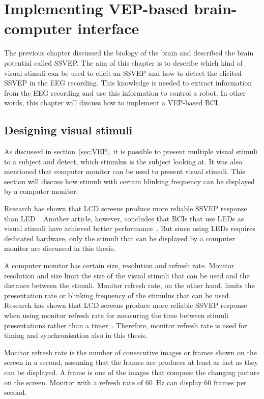 
\chapter{Implementing VEP-based brain-computer interface}

The previous chapter discussed the biology of the brain and described the brain potential called \gls{SSVEP}. The aim of this chapter is to describe which kind of visual stimuli can be used to elicit an \gls{SSVEP} and how to detect the elicited \gls{SSVEP} in the \gls{EEG} recording. This knowledge is needed to extract information from the \gls{EEG} recording and use this information to control a robot. In other words, this chapter will discuss how to implement a \gls{VEP}-based \gls{BCI}.

\section{Designing visual stimuli}
\label{sec:stimuli}

As discussed in section~\ref{sec:VEP}, it is possible to present multiple visual stimuli to a subject and detect, which stimulus is the subject looking at. It was also mentioned that computer monitor can be used to present visual stimuli. This section will discuss how stimuli with certain blinking frequency can be displayed by a computer monitor.

Research has shown that LCD screens produce more reliable \gls{SSVEP} response than \gls{LED}~\cite{lcd_lcd_led}. Another article, however, concludes that \glspl{BCI} that use \glspl{LED} as visual stimuli have achieved better performance~\cite{ssvep_stim}. But since using \glspl{LED} requires dedicated hardware, only the stimuli that can be displayed by a computer monitor are discussed in this thesis.

A computer monitor has certain size, resolution and \gls{refresh rate}. Monitor resolution and size limit the size of the visual stimuli that can be used and the distance between the stimuli. Monitor \gls{refresh rate}, on the other hand, limits the presentation rate or blinking frequency of the stimulus that can be used. Research has shown that LCD screens produce more reliable \gls{SSVEP} response when using monitor \gls{refresh rate} for measuring the time between stimuli presentations rather than a timer~\cite{lcd_lcd_led}. Therefore, monitor \gls{refresh rate} is used for timing and synchronisation also in this thesis.

Monitor \gls{refresh rate} is the number of consecutive images or \glspl{frame} shown on the screen in a second, assuming that the \glspl{frame} are produces at least as fast as they can be displayed. A \gls{frame} is one of the images that compose the changing picture on the screen. Monitor with a \gls{refresh rate} of \SI{60}{Hz} can display 60 \glspl{frame} per second. 

